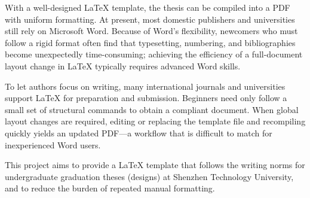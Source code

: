 {}

\begin{abstracten}
With a well-designed \LaTeX{} template, the thesis can be compiled into a PDF with uniform formatting. At present, most domestic publishers and universities still rely on Microsoft Word. Because of Word's flexibility, newcomers who must follow a rigid format often find that typesetting, numbering, and bibliographies become unexpectedly time-consuming; achieving the efficiency of a full-document layout change in \LaTeX{} typically requires advanced Word skills.

To let authors focus on writing, many international journals and universities support \LaTeX{} for preparation and submission. Beginners need only follow a small set of structural commands to obtain a compliant document. When global layout changes are required, editing or replacing the template file and recompiling quickly yields an updated PDF---a workflow that is difficult to match for inexperienced Word users.

This project aims to provide a \LaTeX{} template that follows the writing norms for undergraduate graduation theses (designs) at Shenzhen Technology University, and to reduce the burden of repeated manual formatting.
\end{abstracten}
